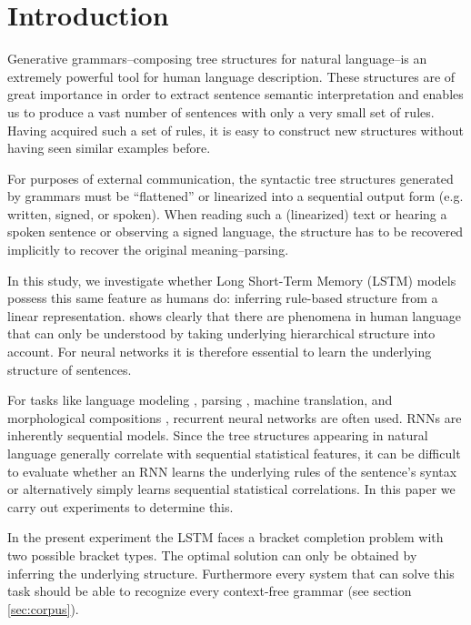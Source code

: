 \documentclass[11pt,a4paper]{article}
\begin{document}
\section{Introduction}

Generative grammars--composing tree structures for natural language--is an extremely powerful tool for human language description.  These structures are of great importance in order to extract sentence semantic interpretation\cite{berwick2016only} and enables us to produce a vast number of sentences with only a very small set of rules. Having acquired such a set of rules, it is easy to construct new structures without having seen similar examples before.

For purposes of external communication, the syntactic tree structures generated by grammars must be ``flattened'' or linearized into a sequential output form (e.g. written, signed, or spoken). When reading such a (linearized) text or hearing a spoken sentence or observing a signed language, the structure has to be recovered implicitly to recover the original meaning--parsing.

In this study, we investigate whether Long Short-Term Memory (LSTM) models \cite{hochreiter1997long} possess this same feature as humans do: inferring rule-based structure from a linear representation. \citeauthor{everaert2015structures}  shows clearly that there are phenomena in human language that can only be understood by taking underlying hierarchical structure into account. For neural networks it is therefore essential to learn the underlying structure of sentences.

For tasks like language modeling \cite{mikolov2010recurrent, sundermeyer2012lstm}, parsing \cite{vinyals2015grammar, kiperwasser2016simple, dyer2016recurrent}, machine translation, \cite{bahdanau2014neural} and morphological compositions \cite{kim2016character}, recurrent neural networks are often used. RNNs are inherently sequential models. Since the tree structures appearing in natural language generally correlate with sequential statistical features, it can be difficult to evaluate whether an RNN learns the underlying rules of the sentence's syntax or alternatively simply learns sequential statistical correlations.  In this paper we carry out experiments to determine this.

In the present experiment the LSTM faces a bracket completion problem with two possible bracket types. The optimal solution can only be obtained by inferring the underlying structure. Furthermore every system that can solve this task should be able to recognize every context-free grammar (see section \ref{sec:corpus}).
\end{document}
